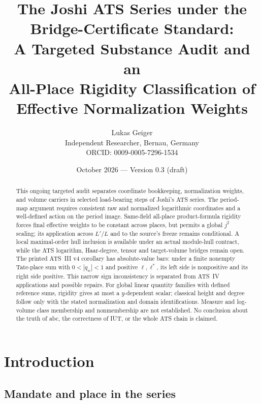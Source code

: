 \documentclass[11pt,a4paper]{article}
\title{The Joshi ATS Series under the\\Bridge-Certificate Standard:\\[2pt]A Targeted Substance Audit and an\\All-Place Rigidity Classification of\\Effective Normalization Weights}
\author{Lukas Geiger\\\small Independent Researcher, Bernau, Germany\\\small ORCID: 0009-0005-7296-1534}
\date{October 2026 --- Version 0.3 (draft)}
\theoremstyle{definition}
\theoremstyle{remark}
\begin{document}
\maketitle

\begin{abstract}
This ongoing targeted audit separates coordinate bookkeeping, normalization
weights, and volume carriers in selected load-bearing steps of Joshi's ATS
series. The period-map argument requires consistent raw and normalized
logarithmic coordinates and a well-defined action on the period image.
Same-field all-place product-formula rigidity forces final effective
weights to be constant across places, but permits a global $j^2$ scaling;
its application across $L'/L$ and to the source's freeze remains conditional.
A local maximal-order hull inclusion is available under an actual module-hull
contract, while the ATS logarithm, Haar-degree, tensor and target-volume
bridges remain open. The printed ATS~III v4 corollary has absolute-value bars:
under a finite nonempty Tate-place sum with $0<|q_w|<1$ and positive
$\ell,\ell^*$, its left side is nonpositive and its right side positive.
This narrow sign inconsistency is separated from ATS~IV applications and
possible repairs. For global linear quantity families with defined reference
sums, rigidity gives at most a $y$-dependent scalar; classical height and
degree follow only with the stated normalization and domain identifications.
Measure and log-volume class membership and nonmembership are not established.
No conclusion about the truth of abc, the correctness of IUT, or the whole
ATS chain is claimed.
\end{abstract}

\clearpage
\tableofcontents
\clearpage

\section{Introduction}\label{sec:intro}

\subsection{Mandate and place in the series}
\end{document}

